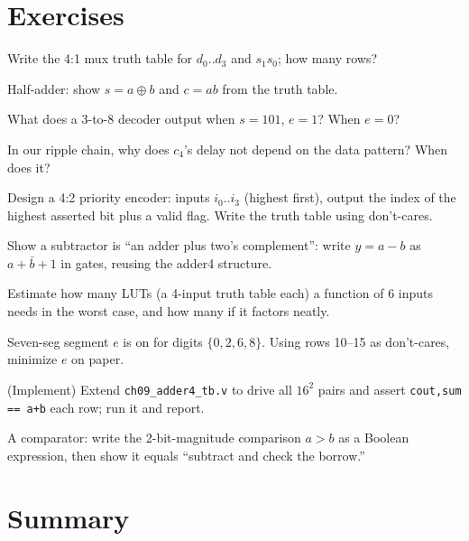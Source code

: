 \section{Exercises}
\label{sec:exercises09}

\begin{exercise}[easy]
Write the 4:1 mux truth table for $d_0..d_3$ and $s_1s_0$; how many rows?
\end{exercise}
\begin{exercise}[easy]
Half-adder: show $s=a\oplus b$ and $c=ab$ from the truth table.
\end{exercise}
\begin{exercise}[easy]
What does a 3-to-8 decoder output when $s=101$, $e=1$? When $e=0$?
\end{exercise}
\begin{exercise}[easy]
In our ripple chain, why does $c_4$'s delay not depend on the data
pattern? When does it?
\end{exercise}
\begin{exercise}[medium]
Design a 4:2 priority encoder: inputs $i_0..i_3$ (highest first),
output the index of the highest asserted bit plus a valid flag. Write
the truth table using don't-cares.
\end{exercise}
\begin{exercise}[medium]
Show a subtractor is ``an adder plus two's complement'': write
$y=a-b$ as $a+\bar b+1$ in gates, reusing the adder4 structure.
\end{exercise}
\begin{exercise}[medium]
Estimate how many LUTs (a 4-input truth table each) a function of 6
inputs needs in the worst case, and how many if it factors neatly.
\end{exercise}
\begin{exercise}[medium]
Seven-seg segment $e$ is on for digits $\{0,2,6,8\}$. Using rows 10--15
as don't-cares, minimize $e$ on paper.
\end{exercise}
\begin{exercise}[hard]
(Implement) Extend \texttt{ch09\_adder4\_tb.v} to drive all $16^2$ pairs
and assert \texttt{cout,sum == a+b} each row; run it and report.
\end{exercise}
\begin{exercise}[hard]
A comparator: write the 2-bit-magnitude comparison $a>b$ as a Boolean
expression, then show it equals ``subtract and check the borrow.''
\end{exercise}

\section{Summary}
\label{sec:summary09}

